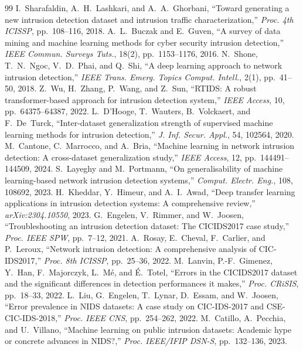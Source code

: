 \documentclass[11pt,a4paper]{article}
\begin{document}
\begin{thebibliography}{99}
 I.~Sharafaldin, A.~H.~Lashkari, and A.~A.~Ghorbani, ``Toward generating a new intrusion detection dataset and intrusion traffic characterization,'' \emph{Proc. 4th ICISSP}, pp.~108--116, 2018.
 A.~L.~Buczak and E.~Guven, ``A survey of data mining and machine learning methods for cyber security intrusion detection,'' \emph{IEEE Commun. Surveys Tuts.}, 18(2), pp.~1153--1176, 2016.
 N.~Shone, T.~N.~Ngoc, V.~D.~Phai, and Q.~Shi, ``A deep learning approach to network intrusion detection,'' \emph{IEEE Trans. Emerg. Topics Comput. Intell.}, 2(1), pp.~41--50, 2018.
 Z.~Wu, H.~Zhang, P.~Wang, and Z.~Sun, ``RTIDS: A robust transformer-based approach for intrusion detection system,'' \emph{IEEE Access}, 10, pp.~64375--64387, 2022.
 L.~D'Hooge, T.~Wauters, B.~Volckaert, and F.~De~Turck, ``Inter-dataset generalization strength of supervised machine learning methods for intrusion detection,'' \emph{J. Inf. Secur. Appl.}, 54, 102564, 2020.
 M.~Cantone, C.~Marrocco, and A.~Bria, ``Machine learning in network intrusion detection: A cross-dataset generalization study,'' \emph{IEEE Access}, 12, pp.~144491--144509, 2024.
 S.~Layeghy and M.~Portmann, ``On generalisability of machine learning-based network intrusion detection systems,'' \emph{Comput. Electr. Eng.}, 108, 108692, 2023.
 H.~Kheddar, Y.~Himeur, and A.~I.~Awad, ``Deep transfer learning applications in intrusion detection systems: A comprehensive review,'' \emph{arXiv:2304.10550}, 2023.
 G.~Engelen, V.~Rimmer, and W.~Joosen, ``Troubleshooting an intrusion detection dataset: The CICIDS2017 case study,'' \emph{Proc. IEEE SPW}, pp.~7--12, 2021.
 A.~Rosay, E.~Cheval, F.~Carlier, and P.~Leroux, ``Network intrusion detection: A comprehensive analysis of CIC-IDS2017,'' \emph{Proc. 8th ICISSP}, pp.~25--36, 2022.
 M.~Lanvin, P.-F.~Gimenez, Y.~Han, F.~Majorczyk, L.~M\'e, and \'E.~Totel, ``Errors in the CICIDS2017 dataset and the significant differences in detection performances it makes,'' \emph{Proc. CRiSIS}, pp.~18--33, 2022.
 L.~Liu, G.~Engelen, T.~Lynar, D.~Essam, and W.~Joosen, ``Error prevalence in NIDS datasets: A case study on CIC-IDS-2017 and CSE-CIC-IDS-2018,'' \emph{Proc. IEEE CNS}, pp.~254--262, 2022.
 M.~Catillo, A.~Pecchia, and U.~Villano, ``Machine learning on public intrusion datasets: Academic hype or concrete advances in NIDS?,'' \emph{Proc. IEEE/IFIP DSN-S}, pp.~132--136, 2023.

\end{thebibliography}
\end{document}
